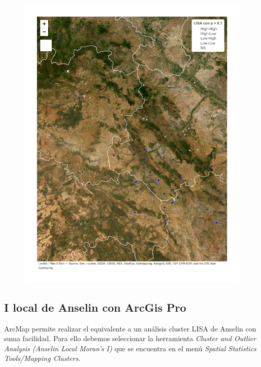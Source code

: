 \documentclass[
  letterpaper,
  DIV=11,
  numbers=noendperiod]{scrreprt}
\begin{document}
\begin{figure}[H]

{\centering \includegraphics{04_AutocorrelacionEspacial_files/figure-pdf/unnamed-chunk-22-1.pdf}

}

\end{figure}

\hypertarget{i-local-de-anselin-con-arcgis-pro}{%
\subsection{I local de Anselin con ArcGis
Pro}\label{i-local-de-anselin-con-arcgis-pro}}

ArcMap permite realizar el equivalente a un análisis cluster LISA de
Anselin con suma facilidad. Para ello debemos seleccionar la herramienta
\emph{Cluster and Outlier Analysis (Anselin Local Moran's I)} que se
encuentra en el menú \emph{Spatial Statistics Tools/Mapping Clusters}.
\end{document}
